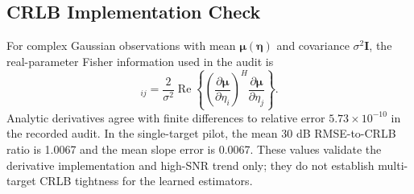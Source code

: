 \subsection{CRLB Implementation Check}

For complex Gaussian observations with mean $\boldsymbol{\mu}(\boldsymbol{\eta})$ and covariance $\sigma^2\mathbf{I}$, the real-parameter Fisher information used in the audit is
\begin{equation}
 [\mathbf{F}(\boldsymbol{\eta})]_{ij}
 =\frac{2}{\sigma^2}\operatorname{Re}\!\left\{
 \left(\frac{\partial\boldsymbol{\mu}}{\partial\eta_i}\right)^{\!H}
 \frac{\partial\boldsymbol{\mu}}{\partial\eta_j}
 \right\}.
 \label{eq:fim}
\end{equation}
Analytic derivatives agree with finite differences to relative error $5.73\times10^{-10}$ in the recorded audit. In the single-target pilot, the mean 30 dB RMSE-to-CRLB ratio is 1.0067 and the mean slope error is 0.0067. These values validate the derivative implementation and high-SNR trend only; they do not establish multi-target CRLB tightness for the learned estimators.
